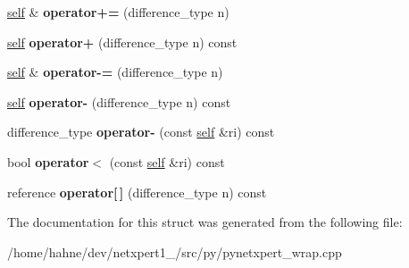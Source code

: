 \begin{DoxyCompactItemize}
\item 
\hyperlink{structswig_1_1SwigPySequence__InputIterator}{self} \& {\bfseries operator+=} (difference\+\_\+type n)\hypertarget{structswig_1_1SwigPySequence__InputIterator_abff285d61554d58f95218ed8b58fb2e8}{}\label{structswig_1_1SwigPySequence__InputIterator_abff285d61554d58f95218ed8b58fb2e8}

\item 
\hyperlink{structswig_1_1SwigPySequence__InputIterator}{self} {\bfseries operator+} (difference\+\_\+type n) const \hypertarget{structswig_1_1SwigPySequence__InputIterator_aaa39b3ee02eeac46dda4c1321d114d71}{}\label{structswig_1_1SwigPySequence__InputIterator_aaa39b3ee02eeac46dda4c1321d114d71}

\item 
\hyperlink{structswig_1_1SwigPySequence__InputIterator}{self} \& {\bfseries operator-\/=} (difference\+\_\+type n)\hypertarget{structswig_1_1SwigPySequence__InputIterator_a2156567b8085288817b8f2ed9a13500e}{}\label{structswig_1_1SwigPySequence__InputIterator_a2156567b8085288817b8f2ed9a13500e}

\item 
\hyperlink{structswig_1_1SwigPySequence__InputIterator}{self} {\bfseries operator-\/} (difference\+\_\+type n) const \hypertarget{structswig_1_1SwigPySequence__InputIterator_a18d3c1e3dc342a602781fa4fac25c268}{}\label{structswig_1_1SwigPySequence__InputIterator_a18d3c1e3dc342a602781fa4fac25c268}

\item 
difference\+\_\+type {\bfseries operator-\/} (const \hyperlink{structswig_1_1SwigPySequence__InputIterator}{self} \&ri) const \hypertarget{structswig_1_1SwigPySequence__InputIterator_a9631174072d6dd02a58550cdca00e916}{}\label{structswig_1_1SwigPySequence__InputIterator_a9631174072d6dd02a58550cdca00e916}

\item 
bool {\bfseries operator$<$} (const \hyperlink{structswig_1_1SwigPySequence__InputIterator}{self} \&ri) const \hypertarget{structswig_1_1SwigPySequence__InputIterator_acad755d5cca0b2468458d6492a9ec525}{}\label{structswig_1_1SwigPySequence__InputIterator_acad755d5cca0b2468458d6492a9ec525}

\item 
reference {\bfseries operator\mbox{[}$\,$\mbox{]}} (difference\+\_\+type n) const \hypertarget{structswig_1_1SwigPySequence__InputIterator_a5311872b73135f3532e1e44a4357921d}{}\label{structswig_1_1SwigPySequence__InputIterator_a5311872b73135f3532e1e44a4357921d}

\end{DoxyCompactItemize}


The documentation for this struct was generated from the following file\+:\begin{DoxyCompactItemize}
\item 
/home/hahne/dev/netxpert1\+\_/src/py/pynetxpert\+\_\+wrap.\+cpp\end{DoxyCompactItemize}
